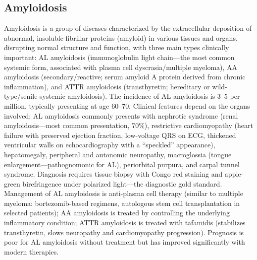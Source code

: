 \subsection{Amyloidosis}
\label{sec:Amyloidosis}
Amyloidosis is a group of diseases characterized by the extracellular deposition of abnormal, insoluble fibrillar proteins (amyloid) in various tissues and organs, disrupting normal structure and function, with three main types clinically important: AL amyloidosis (immunoglobulin light chain---the most common systemic form, associated with plasma cell dyscrasia/multiple myeloma), AA amyloidosis (secondary/reactive; serum amyloid A protein derived from chronic inflammation), and ATTR amyloidosis (transthyretin; hereditary or wild-type/senile systemic amyloidosis). The incidence of AL amyloidosis is 3--5 per million, typically presenting at age 60--70. Clinical features depend on the organs involved: AL amyloidosis commonly presents with nephrotic syndrome (renal amyloidosis---most common presentation, 70\%), restrictive cardiomyopathy (heart failure with preserved ejection fraction, low-voltage QRS on ECG, thickened ventricular walls on echocardiography with a ``speckled'' appearance), hepatomegaly, peripheral and autonomic neuropathy, macroglossia (tongue enlargement---pathognomonic for AL), periorbital purpura, and carpal tunnel syndrome. Diagnosis requires tissue biopsy with Congo red staining and apple-green birefringence under polarized light---the diagnostic gold standard. Management of AL amyloidosis is anti-plasma cell therapy (similar to multiple myeloma: bortezomib-based regimens, autologous stem cell transplantation in selected patients); AA amyloidosis is treated by controlling the underlying inflammatory condition; ATTR amyloidosis is treated with tafamidis (stabilizes transthyretin, slows neuropathy and cardiomyopathy progression). Prognosis is poor for AL amyloidosis without treatment but has improved significantly with modern therapies.

